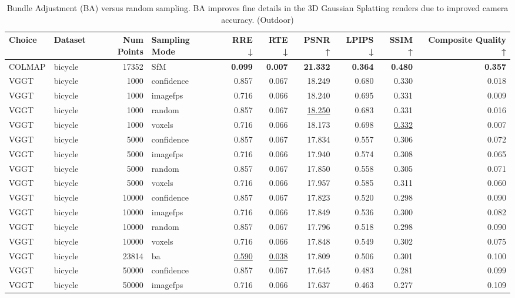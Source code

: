 \begin{table}[H]
\caption{\ifdefined\customcaption \customcaption \else Bundle Adjustment (BA) versus random sampling. BA improves fine details in the 3D Gaussian Splatting renders due to improved camera accuracy. (Outdoor) \fi}
\label{tab:03_sampling_mode_ba_outdoor}
\centering
\tiny
\begin{tabular}{llrlrrrrrr}
\toprule
Choice & Dataset & Num Points & Sampling Mode & RRE ↓ & RTE ↓ & PSNR ↑ & LPIPS ↓ & SSIM ↑ & Composite Quality ↑ \\
\midrule
COLMAP & bicycle & 17352 & SfM & \textbf{0.099} & \textbf{0.007} & \textbf{21.332} & \textbf{0.364} & \textbf{0.480} & \textbf{0.357} \\
VGGT & bicycle & 1000 & confidence & 0.857 & 0.067 & 18.249 & 0.680 & 0.330 & 0.018 \\
VGGT & bicycle & 1000 & imagefps & 0.716 & 0.066 & 18.240 & 0.695 & 0.331 & 0.009 \\
VGGT & bicycle & 1000 & random & 0.857 & 0.067 & \underline{18.250} & 0.683 & 0.331 & 0.016 \\
VGGT & bicycle & 1000 & voxels & 0.716 & 0.066 & 18.173 & 0.698 & \underline{0.332} & 0.007 \\
VGGT & bicycle & 5000 & confidence & 0.857 & 0.067 & 17.834 & 0.557 & 0.306 & 0.072 \\
VGGT & bicycle & 5000 & imagefps & 0.716 & 0.066 & 17.940 & 0.574 & 0.308 & 0.065 \\
VGGT & bicycle & 5000 & random & 0.857 & 0.067 & 17.850 & 0.558 & 0.305 & 0.071 \\
VGGT & bicycle & 5000 & voxels & 0.716 & 0.066 & 17.957 & 0.585 & 0.311 & 0.060 \\
VGGT & bicycle & 10000 & confidence & 0.857 & 0.067 & 17.823 & 0.520 & 0.298 & 0.090 \\
VGGT & bicycle & 10000 & imagefps & 0.716 & 0.066 & 17.849 & 0.536 & 0.300 & 0.082 \\
VGGT & bicycle & 10000 & random & 0.857 & 0.067 & 17.796 & 0.518 & 0.298 & 0.090 \\
VGGT & bicycle & 10000 & voxels & 0.716 & 0.066 & 17.848 & 0.549 & 0.302 & 0.075 \\
VGGT & bicycle & 23814 & ba & \underline{0.590} & \underline{0.038} & 17.809 & 0.506 & 0.301 & 0.100 \\
VGGT & bicycle & 50000 & confidence & 0.857 & 0.067 & 17.645 & 0.483 & 0.281 & 0.099 \\
VGGT & bicycle & 50000 & imagefps & 0.716 & 0.066 & 17.637 & 0.463 & 0.277 & 0.109 \\

\end{tabular}
\end{table}
